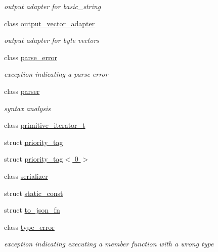 \begin{DoxyCompactItemize}
\begin{DoxyCompactList}\small\item\em output adapter for basic\+\_\+string \end{DoxyCompactList}\item 
class \hyperlink{classnlohmann_1_1detail_1_1output__vector__adapter}{output\+\_\+vector\+\_\+adapter}
\begin{DoxyCompactList}\small\item\em output adapter for byte vectors \end{DoxyCompactList}\item 
class \hyperlink{classnlohmann_1_1detail_1_1parse__error}{parse\+\_\+error}
\begin{DoxyCompactList}\small\item\em exception indicating a parse error \end{DoxyCompactList}\item 
class \hyperlink{classnlohmann_1_1detail_1_1parser}{parser}
\begin{DoxyCompactList}\small\item\em syntax analysis \end{DoxyCompactList}\item 
class \hyperlink{classnlohmann_1_1detail_1_1primitive__iterator__t}{primitive\+\_\+iterator\+\_\+t}
\item 
struct \hyperlink{structnlohmann_1_1detail_1_1priority__tag}{priority\+\_\+tag}
\item 
struct \hyperlink{structnlohmann_1_1detail_1_1priority__tag_3_010_01_4}{priority\+\_\+tag$<$ 0 $>$}
\item 
class \hyperlink{classnlohmann_1_1detail_1_1serializer}{serializer}
\item 
struct \hyperlink{structnlohmann_1_1detail_1_1static__const}{static\+\_\+const}
\item 
struct \hyperlink{structnlohmann_1_1detail_1_1to__json__fn}{to\+\_\+json\+\_\+fn}
\item 
class \hyperlink{classnlohmann_1_1detail_1_1type__error}{type\+\_\+error}
\begin{DoxyCompactList}\small\item\em exception indicating executing a member function with a wrong type \end{DoxyCompactList}\end{DoxyCompactItemize}
